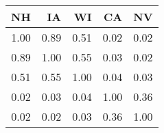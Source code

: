 \begin{tabular}{rrrrr}
\midrule  NH & IA & WI & CA & NV \\  \midrule
 1.00 & 0.89 & 0.51 & 0.02 & 0.02 \\ 
  0.89 & 1.00 & 0.55 & 0.03 & 0.02 \\ 
  0.51 & 0.55 & 1.00 & 0.04 & 0.03 \\ 
  0.02 & 0.03 & 0.04 & 1.00 & 0.36 \\ 
  0.02 & 0.02 & 0.03 & 0.36 & 1.00 \\ 
  \end{tabular} 
